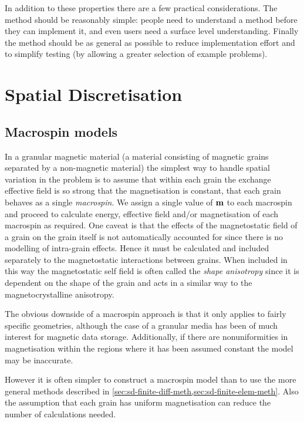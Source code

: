 In addition to these properties there are a few practical considerations.
The method should be reasonably simple: people need to understand a method before they can implement it, and even users need a surface level understanding.
Finally the method should be as general as possible to reduce implementation effort and to simplify testing (by allowing a greater selection of example problems).


\section{Spatial Discretisation}
\label{sec:spat-discr}

\subsection{Macrospin models}
\label{sec:sd-macrospins}

In a granular magnetic material (a material consisting of magnetic grains separated by a non-magnetic material) the simplest way to handle spatial variation in the problem is to assume that within each grain the exchange effective field is so strong that the magnetisation is constant, \ie that each grain behaves as a single \emph{macrospin}.
We assign a single value of $\boldsymbol{\mathrm{m}}$ to each macrospin and proceed to calculate energy, effective field and/or magnetisation of each macrospin as required.
One caveat is that the effects of the magnetostatic field of a grain on the grain itself is not automatically accounted for since there is no modelling of intra-grain effects.
Hence it must be calculated and included separately to the magnetostatic interactions between grains.
When included in this way the magnetostatic self field is often called the \emph{shape anisotropy} since it is dependent on the shape of the grain and acts in a similar way to the magnetocrystalline anisotropy.

The obvious downside of a macrospin approach is that it only applies to fairly specific geometries, although the case of a granular media has been of much interest for magnetic data storage.
Additionally, if there are nonuniformities in magnetisation within the regions where it has been assumed constant the model may be inaccurate.

However it is often simpler to construct a macrospin model than to use the more general methods described in \cref{sec:sd-finite-diff-meth,sec:sd-finite-elem-meth}.
Also the assumption that each grain has uniform magnetisation can reduce the number of calculations needed.

